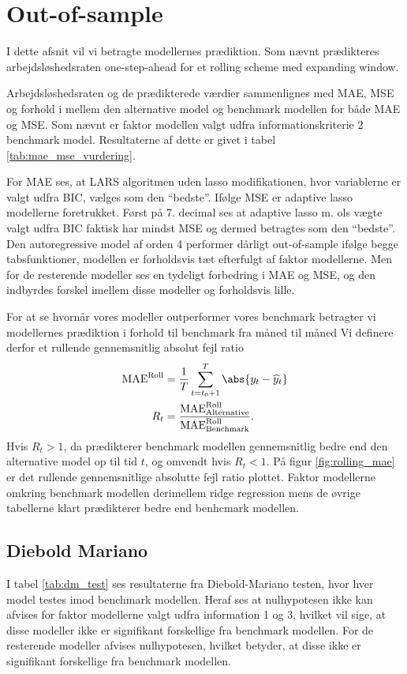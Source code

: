 \section{Out-of-sample}
I dette afsnit vil vi betragte modellernes prædiktion.
Som nævnt prædikteres arbejdsløshedsraten one-step-ahead for et rolling scheme med expanding window.

Arbejdsløshedsraten og de prædikterede værdier sammenlignes med MAE, MSE og forhold i mellem den alternative model og benchmark modellen for både MAE og MSE.
Som nævnt er faktor modellen valgt udfra informationskriterie 2 benchmark model.
Resultaterne af dette er givet i tabel \ref{tab:mae_mse_vurdering}.
%


For MAE ses, at LARS algoritmen uden lasso modifikationen, hvor variablerne er valgt udfra BIC, vælges som den ``bedste''.
Ifølge MSE er adaptive lasso modellerne foretrukket.
Først på 7. decimal ses at adaptive lasso m. ols vægte valgt udfra BIC faktisk har mindst MSE og dermed betragtes som den ``bedste''.
Den autoregressive model af orden 4 performer dårligt out-of-sample ifølge begge tabsfunktioner, modellen er forholdsvis tæt efterfulgt af faktor modellerne.
Men for de resterende modeller ses en tydeligt forbedring i MAE og MSE, og den indbyrdes forskel imellem disse modeller og forholdsvis lille.

For at se hvornår vores modeller outperformer vores benchmark betragter vi modellernes prædiktion i forhold til benchmark fra måned til måned
Vi definere derfor et rullende gennemsnitlig absolut fejl ratio 
\begin{align*}
\text{MAE}^\text{Roll} &= \frac{1}{T} \sum_{t = t_0 +1}^{T} \abs{y_t - \widehat{y}_t} \\
R_t &= \frac{\text{MAE}_\text{Alternative}^\text{Roll}}{\text{MAE}_\text{Benchmark}^\text{Roll}}.
\end{align*}
Hvis \(R_t > 1\), da prædikterer benchmark modellen gennemsnitlig bedre end den alternative model op til tid \(t\), og omvendt hvis \(R_t < 1\).
På figur \ref{fig:rolling_mae} er det rullende gennemsnitlige absolutte fejl ratio plottet.
Faktor modellerne omkring benchmark modellen
derimellem ridge regression
mens de øvrige tabellerne klart prædikterer bedre end benhcmark modellen.
%
%

\subsection{Diebold Mariano}
I tabel \ref{tab:dm_test} ses resultaterne fra Diebold-Mariano testen, hvor hver model testes imod benchmark modellen.
Heraf ses at nulhypotesen ikke kan afvises for faktor modellerne valgt udfra information 1 og 3, hvilket vil sige, at disse modeller ikke er signifikant forskellige fra benchmark modellen.
For de resterende modeller afvises nulhypotesen, hvilket betyder, at disse ikke er signifikant forskellige fra benchmark modellen.
%

%
\newpage

